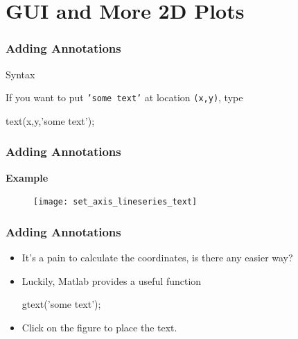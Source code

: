 \documentclass{beamer}  %
\begin{document}
\section{GUI and More 2D Plots}
\begin{frame}[fragile]
\frametitle{Adding Annotations}

\begin{block}{Syntax}

If you want to put \texttt{'some text'} at location \texttt{(x,y)}, type
\begin{matlabcodebeamer}[numbers=none,frame=none]
          text(x,y,'some text');
\end{matlabcodebeamer}
\end{block}

\end{frame}
\begin{frame}[fragile]
\frametitle{Adding Annotations}
\textbf{Example} 

\setcounter{subfigure}{0}
\begin{figure}
    \centering
   \texttt{[image: set\_axis\_lineseries\_text]}
\end{figure}

\end{frame}
\begin{frame}[fragile]
\frametitle{Adding Annotations}
\begin{itemize}[<+->]
    \item It's a pain to calculate the coordinates, is there any easier way?
    
    \item Luckily, Matlab provides a useful function
          \begin{matlabcode}[numbers=none,frame=none]
          gtext('some text');
          \end{matlabcode}

    \item Click on the figure to place the text.
\end{itemize}

\end{frame}
\end{document}
